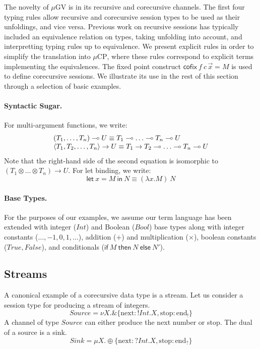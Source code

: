 \documentclass[orivec,envcountsame]{llncs}
\makeatletter
\newcommand{\with}{\mathbin\binampersand}
\newcommand{\lto}{\ensuremath{\multimap}}
\newcommand{\uto}{\ensuremath{\rightarrow}}
\newcommand{\outterm}{\mathrm{end}_!}
\newcommand{\interm}{\mathrm{end}_?}
\newcommand{\mkwd}[1]{\mathsf{#1}}
\newcommand{\clabel}[1]{\mathrm{#1}}
\newcommand{\lrkwd}{\mkwd{cofix}}
\newcommand{\gvfix}[3]{\lrkwd\:#1\:#2 = #3}
\newcommand{\gvifthen}[3]{\mkwd{if}\:#1\:\mkwd{then}\:#2\:\mkwd{else}\:#3}
\newcommand{\key}{\mkwd}
\newcommand{\mucp}{$\mu\mathrm{CP}$\xspace}
\newcommand{\mugv}{$\mu\mathrm{GV}$\xspace}
\newcommand{\ba}{\begin{array}}
\newcommand{\ea}{\end{array}}
\newcommand{\bl}{\ba[t]{@{}l@{}}}
\newcommand{\el}{\ea}
\newcommand{\secref}[1]{(\S\ref{sec:#1})}
\makeatother
\begin{document}
The novelty of \mugv is in its recursive and corecursive channels. The first four typing rules allow
recursive and corecursive session types to be used as their unfoldings, and vice versa. Previous
work on recursive sessions has typically included an equivalence relation on types, taking unfolding
into account, and interpretting typing rules up to equivalence. We present explicit rules in order
to simplify the translation into \mucp, where these rules correspond to explicit terms implementing
the equivalences.
%
The fixed point construct $\gvfix{f}{c\,\vec{x}}{M}$ is used to define corecursive sessions. We
illustrate its use in the rest of this section through a selection of basic examples.

\paragraph{Syntactic Sugar.}

For multi-argument functions, we write:
\[
  \bl
  (T_1, \dots, T_n) \lto U \equiv T_1 \lto \dots \lto T_n \lto U \\
  \langle T_1, T_2, \dots, T_n \rangle \uto U \equiv T_1 \uto T_2 \lto \dots \lto T_n \lto U \\
  \el
\]
Note that the right-hand side of the second equation is isomorphic to $(T_1 \otimes \dots \otimes
T_n) \uto U$.
%
For let binding, we write:
\[
\key{let}\:x=M\:\key{in}\:N \equiv (\lambda x.M)\:N
\]

\paragraph{Base Types.}

For the purposes of our examples, we assume our term language has been extended with integer ($Int$)
and Boolean ($Bool$) base types along with integer constants ($\dots,-1,0,1,\dots$), addition ($+$)
and multiplication ($\times$), boolean constants ($True, False$), and conditionals
($\gvifthen{M}{N}{N'}$).
%

\subsection{Streams}

A canonical example of a corecursive data type is a stream. Let us consider a session type for
producing a stream of integers.
%
\[
Source = \nu X.\with \{\clabel{next}: !Int.X, \clabel{stop}: \outterm \}
\]
%
A channel of type $Source$ can either produce the next number or stop. The dual of a source is a
sink.
\[
Sink = \mu X.\oplus \{\clabel{next}: ?Int.X, \clabel{stop}: \interm \}
\]
\end{document}
